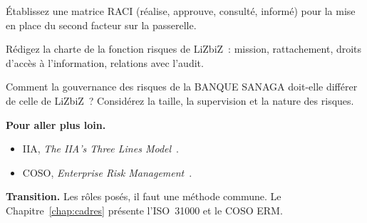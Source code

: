 \begin{boxexo}[title={\ding{45}\quad Exercice~3.8. RACI \niveaumoyen}]
Établissez une matrice RACI (réalise, approuve, consulté, informé) pour la
mise en place du second facteur sur la passerelle.
\end{boxexo}

\begin{boxexo}[title={\ding{45}\quad Exercice~3.9. Charte \niveauexpert}]
Rédigez la charte de la fonction risques de LiZbiZ~: mission, rattachement,
droits d'accès à l'information, relations avec l'audit.
\end{boxexo}

\begin{boxexo}[title={\ding{45}\quad Exercice~3.10. Une banque \niveauexpert}]
Comment la gouvernance des risques de la BANQUE SANAGA doit-elle différer
de celle de LiZbiZ~? Considérez la taille, la supervision et la nature
des risques.
\end{boxexo}

\bigskip

\begin{boxinfo}
\textbf{Pour aller plus loin.}
\begin{itemize}
    \item IIA, \emph{The IIA's Three Lines Model}~\cite{iia2020troislignes}.
    \item COSO, \emph{Enterprise Risk Management}~\cite{coso2017erm}.
\end{itemize}
\end{boxinfo}

\begin{boxinfo}
\textbf{Transition.} Les rôles posés, il faut une méthode commune. Le
Chapitre~\ref{chap:cadres} présente l'ISO~31000 et le COSO ERM.
\end{boxinfo}
